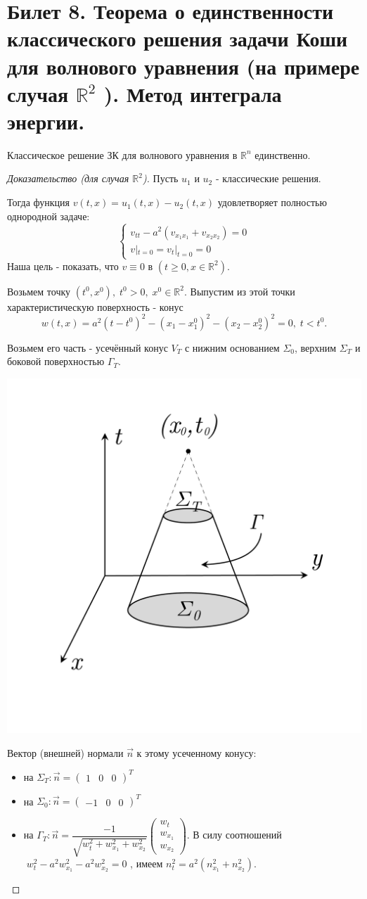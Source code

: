 \documentclass[../main.tex]{subfiles}
\begin{document}
\section{Билет 8. Теорема о единственности классического решения задачи Коши для волнового уравнения (на примере случая $\mathbb{R}^2$ ). Метод интеграла энергии.}


\begin{theorem} Классическое решение ЗК для волнового уравнения в $\mathbb{R}^n$ единственно.
\end{theorem}
\begin{proof}[Доказательство (для случая $\mathbb{R}^2$)]
Пусть $u_{1}$ и $u_{2}$ - классические решения.

Тогда функция $v(t,x) = u_{1}(t,x) - u_{2}(t,x)$ удовлетворяет полностью однородной задаче: 
\begin{equation*}
    \left\{
        \begin{matrix}
        v_{tt} - a^2(v_{x_1x_1} + v_{x_2x_2}) = 0\\
        v|_{t=0} = v_{t}|_{t=0} = 0
        \end{matrix}
    \right.
\end{equation*}
Наша цель - показать, что $v\equiv 0 $ в $ (t\geq 0, x\in \mathbb{R}^2) $.

Возьмем точку $ (t^0,x^0),\; t^0> 0,\; x^0\in\mathbb{R}^2 $. \; Выпустим из этой точки характеристическую поверхность - конус 
$$ 
w(t,x) = a^2(t - t^0)^2 - (x_1 - x_1^0)^2 - (x_2 - x_2^0)^2 = 0,\; t<t^0.
$$

Возьмем его часть - усечённый конус $ V_T $ с нижним основанием $ \Sigma_0 $, верхним $ \Sigma_T $  и боковой поверхностью $ \Gamma_T. $
\begin{center}
\includegraphics[width=0.28\linewidth]{pic 8.pdf}
\end{center}
Вектор (внешней) нормали $ \vec{n} $ к этому усеченному конусу:
\begin{itemize}
	\item на $\Sigma_T: \vec{n} = \begin{pmatrix}1 & 0 & 0\end{pmatrix}^T $
	\item на $\Sigma_0: \vec{n} = \begin{pmatrix}-1 & 0 & 0\end{pmatrix}^T $
	\item на $\Gamma_T:\vec{n}=\dfrac{-1}{\sqrt{w_t^2+w^2_{x_1}+w^2_{x_2}}}\begin{pmatrix}w_t\\w_{x_1}\\w_{x_2}\end{pmatrix}$. \; В силу соотношений $\; w_t^2 - a^2w^2_{x_1} - a^2w^2_{x_2} = 0 $ , имеем $n^2_t = a^2(n^2_{x_1} + n^2_{x_2})$.


\end{itemize}
\end{proof}
\end{document}
